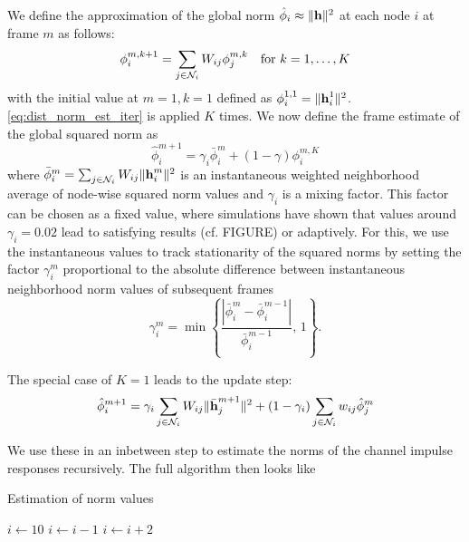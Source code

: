 \documentclass{article}
\begin{document}
We define the approximation of the global norm \(\hat{\phi}_i \approx \|\bm{\mathrm{h}}\|^2\) at each node \(i\) at frame \(m\) as follows:
\begin{equation}
  \phi_i^{m,k+1} = \sum_{j \in \mathcal{N}_i} W_{ij} \phi_j^{m,k}\quad\text{for }k=1,\ldots,K\label{eq:dist_norm_est_iter}
\end{equation}
with the initial value at \(m=1,k=1\) defined as \(\phi_i^{1,1}=\|\bm{\mathrm{h}}_i^{1}\|^2\).
\eqref{eq:dist_norm_est_iter} is applied \(K\) times.
We now define the frame estimate of the global squared norm as
\begin{equation}
  \hat{\phi}_i^{m+1} = \gamma_i \bar{\phi}_i^{m} + (1-\gamma) \phi_i^{m,K}
\end{equation}
where \(\bar{\phi}_i^{m} = \sum_{j \in \mathcal{N}_i} W_{ij} \|\bm{\mathrm{h}}_i^m\|^2\) is an instantaneous weighted neighborhood average of node-wise squared norm values and \(\gamma_i\) is a mixing factor.
This factor can be chosen as a fixed value, where simulations have shown that values around \(\gamma_i = 0.02\) lead to satisfying results (cf. FIGURE) or adaptively.
For this, we use the instantaneous values to track stationarity of the squared norms by setting the factor \(\gamma_i^{m}\) proportional to the absolute difference between instantaneous neighborhood norm values of subsequent frames
\begin{equation}
  \gamma_i^{m} = \min \left\lbrace \frac{| \bar{\phi}_i^{m} - \bar{\phi}_i^{m-1} |}{\bar{\phi}_i^{m-1}},\,1\right\rbrace.
\end{equation}

The special case of \(K=1\) leads to the update step:
\begin{equation}
  \hat{\phi}_i^{m+1} = \gamma_i \sum_{j \in \mathcal{N}_i} W_{ij} \| \bar{\bm{\mathrm{h}}}_j^{m+1} \|^2 + (1-\gamma_i) \sum_{j \in \mathcal{N}_i} w_{ij} \hat{\phi}_j^m
\end{equation}

We use these in an inbetween step to estimate the norms of the channel impulse responses recursively. The full algorithm then looks like

\begin{algorithm}
  \caption{Estimation of norm values}\label{alg:davg_norm_est}
  $i\gets 10$\;
  {
      $i\gets i-1$\;
  }{
      {
          $i\gets i+2$\;
      }
  }
\end{algorithm}
\end{document}
